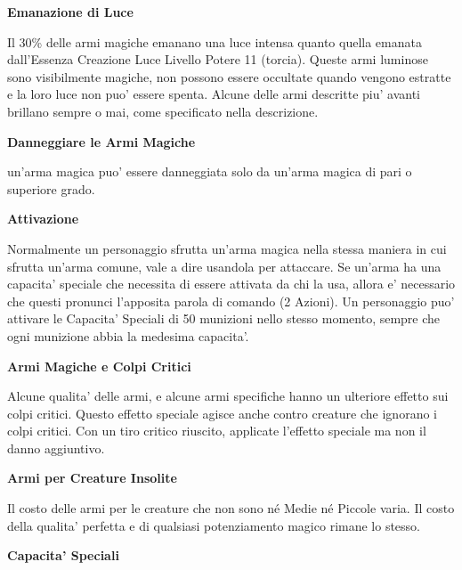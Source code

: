 \documentclass[a4paper,11pt,twoside,openany]{book}
\begin{document}
{		\textbf{Emanazione di Luce}
		
		Il 30\% delle armi magiche emanano una luce intensa quanto quella emanata dall'Essenza Creazione Luce Livello Potere 11 (torcia). Queste armi luminose sono visibilmente magiche, non possono essere occultate quando vengono estratte e la loro luce non puo' essere spenta. Alcune delle armi descritte piu' avanti brillano sempre o mai, come specificato nella descrizione.
		
		\textbf{Danneggiare le Armi Magiche}
		
		un'arma magica puo' essere danneggiata solo da un'arma magica di pari o superiore grado.
		
		\textbf{Attivazione}
		
		Normalmente un personaggio sfrutta un'arma magica nella stessa maniera in cui sfrutta un'arma comune, vale a dire usandola per attaccare. Se un'arma ha una capacita' speciale che necessita di essere attivata da chi la usa, allora e' necessario che questi pronunci l'apposita parola di comando (2 Azioni). Un personaggio puo' attivare le Capacita' Speciali di 50 munizioni nello stesso momento, sempre che ogni munizione abbia la medesima capacita'.
		
		\textbf{Armi Magiche e Colpi Critici}
		
		Alcune qualita' delle armi, e alcune armi specifiche hanno un ulteriore effetto sui colpi critici. Questo effetto speciale agisce anche contro creature che ignorano i colpi critici. Con un tiro critico riuscito, applicate l'effetto speciale ma non il danno aggiuntivo.
		
		\textbf{Armi per Creature Insolite}
		
		Il costo delle armi per le creature che non sono né Medie né Piccole varia. Il costo della qualita' perfetta e di qualsiasi potenziamento
		magico rimane lo stesso.
		
		\bigskip
		
		\textbf{Capacita' Speciali}
		
		\bigskip
		
}
\end{document}
